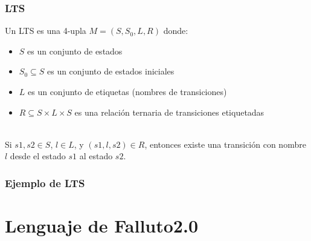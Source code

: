 \documentclass[serif]{beamer}
\begin{document}
\begin{frame}
\frametitle{LTS}
Un LTS es una 4-upla $M = (S,S_{0},L,R)$ donde:\\[0.3cm]
\begin{itemize}\itemsep10pt
\item $S$ es un conjunto de estados
\item $S_0 \subseteq S$ es un conjunto de estados iniciales
\item $L$ es un conjunto de etiquetas (nombres de transiciones)
\item $R \subseteq S \times L \times S$ es una relación ternaria de transiciones 
etiquetadas
\end{itemize}
~\\
Si $s1, s2 \in S$, $l \in L$, y $(s1,l,s2) \in R$, entonces existe una 
transición con nombre $l$ desde el estado $s1$ al estado $s2$.
\end{frame}


\begin{frame}
\frametitle{Ejemplo de LTS}
\end{frame}




\section[Lenguaje]{Lenguaje de Falluto2.0}
\end{document}
